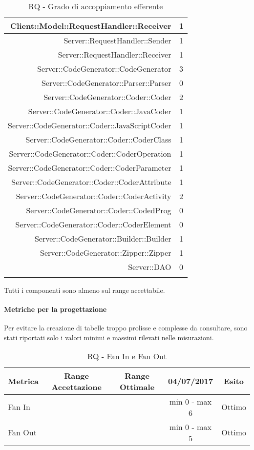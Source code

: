 \documentclass[../PianoDiQualifica.tex]{subfiles}
\begin{document}
\begin{longtable}{|r|c|}
						Client::Model::RequestHandler::Receiver & 1 \\ \hline
						Server::RequestHandler::Sender & 1 \\ \hline
						Server::RequestHandler::Receiver & 1 \\ \hline
						Server::CodeGenerator::CodeGenerator & 3 \\ \hline
						Server::CodeGenerator::Parser::Parser & 0 \\ \hline
						Server::CodeGenerator::Coder::Coder & 2 \\ \hline
						Server::CodeGenerator::Coder::JavaCoder & 1\\ \hline
						Server::CodeGenerator::Coder::JavaScriptCoder & 1\\ \hline
						Server::CodeGenerator::Coder::CoderClass & 1\\ \hline
						Server::CodeGenerator::Coder::CoderOperation & 1\\ \hline
						Server::CodeGenerator::Coder::CoderParameter & 1\\ \hline
						Server::CodeGenerator::Coder::CoderAttribute & 1\\ \hline
						Server::CodeGenerator::Coder::CoderActivity & 2\\ \hline
						Server::CodeGenerator::Coder::CodedProg & 0\\ \hline
						Server::CodeGenerator::Coder::CoderElement & 0\\ \hline
						Server::CodeGenerator::Builder::Builder & 1 \\ \hline
						Server::CodeGenerator::Zipper::Zipper & 1 \\ \hline
						Server::DAO & 0 \\ \hline
					\caption{RQ - Grado di accoppiamento efferente}
					\end{longtable}
					Tutti i componenti sono almeno sul range accettabile.
					\paragraph{Metriche per la progettazione\\}
						Per evitare la creazione di tabelle troppo prolisse e complesse da consultare,
						sono stati riportati solo i valori minimi e massimi rilevati nelle misurazioni.
						\begin{table}[H]
							\center
							\begin{tabular}{|l|c|c|c|c|}
								\hline
								\rowcolor{blue!30}\textbf{Metrica} & \textbf{Range Accettazione} & \textbf{Range Ottimale}&\textbf{04/07/2017}&\textbf{Esito} \\ \hline
								Fan In & & & min 0 - max 6 & Ottimo \\ \hline
								Fan Out & & & min 0 - max 5	& Ottimo \\ \hline
							\end{tabular}
							\caption{RQ - Fan In e Fan Out}
						\end{table}
\end{document}
